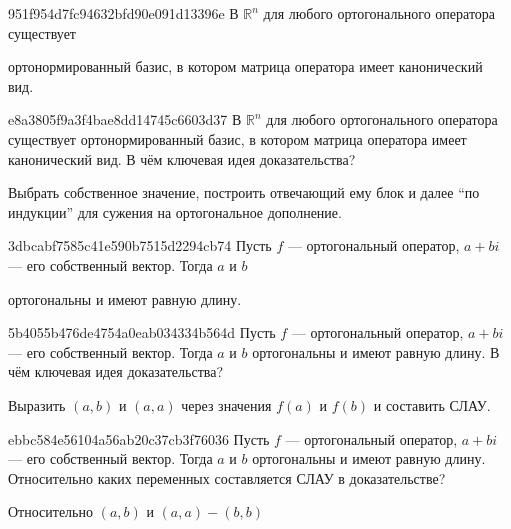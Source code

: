 \begin{note}{951f954d7fc94632bfd90e091d13396e}
    В \({ \mathbb R^{n} }\) для любого ортогонального оператора существует \begin{icloze}{1}ортонормированный базис, в котором матрица оператора имеет канонический вид.\end{icloze}
\end{note}

\begin{note}{e8a3805f9a3f4bae8dd14745c6603d37}
    В \({ \mathbb R^{n} }\) для любого ортогонального оператора существует ортонормированный базис, в котором матрица оператора имеет канонический вид.
    В чём ключевая идея доказательства?

    \begin{cloze}{1}
        Выбрать собственное значение, построить отвечающий ему блок и далее ``по индукции'' для сужения на ортогональное дополнение.
    \end{cloze}
\end{note}

\begin{note}{3dbcabf7585c41e590b7515d2294cb74}
    Пусть \({ f }\) --- ортогональный оператор,\: \({ a + bi }\) --- его собственный вектор.
    Тогда \({ a }\) и \({ b }\) \begin{icloze}{1}ортогональны и имеют равную длину.\end{icloze}
\end{note}

\begin{note}{5b4055b476de4754a0eab034334b564d}
    Пусть \({ f }\) --- ортогональный оператор,\: \({ a + bi }\) --- его собственный вектор.
    Тогда \({ a }\) и \({ b }\) ортогональны и имеют равную длину.
    В чём ключевая идея доказательства?

    \begin{cloze}{1}
        Выразить \({ (a, b) }\) и \({ (a, a) }\) через значения \({ f(a) }\) и \({ f(b) }\) и составить СЛАУ.
    \end{cloze}
\end{note}

\begin{note}{ebbc584e56104a56ab20c37cb3f76036}
    Пусть \({ f }\) --- ортогональный оператор,\: \({ a + bi }\) --- его собственный вектор.
    Тогда \({ a }\) и \({ b }\) ортогональны и имеют равную длину.
    Относительно каких переменных составляется СЛАУ в доказательстве?

    \begin{cloze}{1}
         Относительно \({ (a, b) }\) и \({ (a, a) - (b, b) }\)
    \end{cloze}
\end{note}

